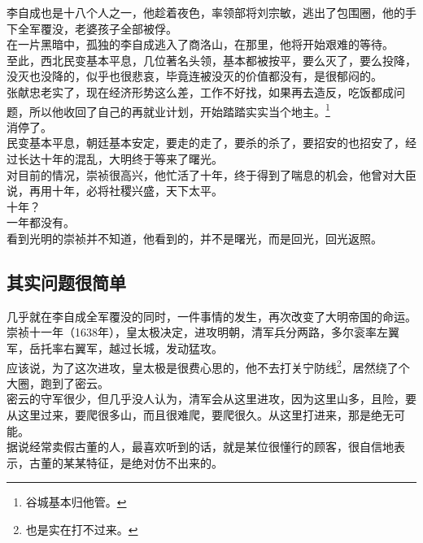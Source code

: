 \begin{multicols}{\theparacolNo}
李自成也是十八个人之一，他趁着夜色，率领部将刘宗敏，逃出了包围圈，他的手下全军覆没，老婆孩子全部被俘。\\

在一片黑暗中，孤独的李自成逃入了商洛山，在那里，他将开始艰难的等待。\\

至此，西北民变基本平息，几位著名头领，基本都被按平，要么灭了，要么投降，没灭也没降的，似乎也很悲哀，毕竟连被没灭的价值都没有，是很郁闷的。\\

张献忠老实了，现在经济形势这么差，工作不好找，如果再去造反，吃饭都成问题，所以他收回了自己的再就业计划，开始踏踏实实当个地主。\footnote{谷城基本归他管。}\\

消停了。\\

民变基本平息，朝廷基本安定，要走的走了，要杀的杀了，要招安的也招安了，经过长达十年的混乱，大明终于等来了曙光。\\

对目前的情况，崇祯很高兴，他忙活了十年，终于得到了喘息的机会，他曾对大臣说，再用十年，必将社稷兴盛，天下太平。\\

十年？\\

一年都没有。\\

看到光明的崇祯并不知道，他看到的，并不是曙光，而是回光，回光返照。\\

\subsection{其实问题很简单}
几乎就在李自成全军覆没的同时，一件事情的发生，再次改变了大明帝国的命运。\\

崇祯十一年（1638年），皇太极决定，进攻明朝，清军兵分两路，多尔衮率左翼军，岳托率右翼军，越过长城，发动猛攻。\\

应该说，为了这次进攻，皇太极是很费心思的，他不去打关宁防线\footnote{也是实在打不过来。}，居然绕了个大圈，跑到了密云。\\

密云的守军很少，但几乎没人认为，清军会从这里进攻，因为这里山多，且险，要从这里过来，要爬很多山，而且很难爬，要爬很久。从这里打进来，那是绝无可能。\\

据说经常卖假古董的人，最喜欢听到的话，就是某位很懂行的顾客，很自信地表示，古董的某某特征，是绝对仿不出来的。\\


\end{multicols}
